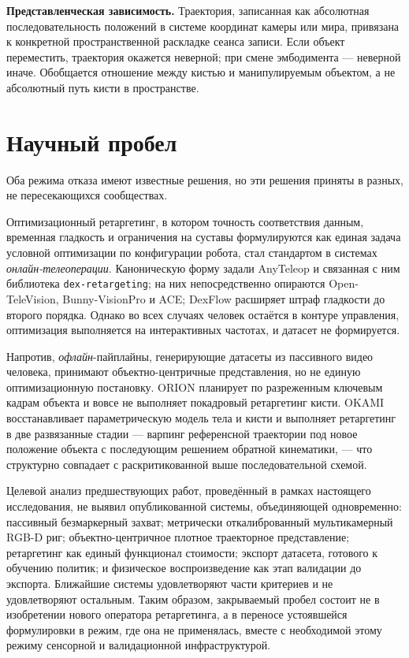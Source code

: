 \documentclass[12pt, a4paper, oneside]{report}
\begin{document}
\textbf{Представленческая зависимость.} Траектория, записанная как абсолютная
последовательность положений в системе координат камеры или мира, привязана к
конкретной пространственной раскладке сеанса записи. Если объект переместить,
траектория окажется неверной; при смене эмбодимента --- неверной иначе.
Обобщается отношение между кистью и манипулируемым объектом, а не абсолютный
путь кисти в пространстве.

\section{Научный пробел}

Оба режима отказа имеют известные решения, но эти решения приняты в разных,
не пересекающихся сообществах.

Оптимизационный ретаргетинг, в котором точность соответствия данным, временная
гладкость и ограничения на суставы формулируются как единая задача условной
оптимизации по конфигурации робота, стал стандартом в системах
\emph{онлайн-телеоперации}. Каноническую форму задали AnyTeleop и связанная с
ним библиотека \texttt{dex-retargeting}; на них непосредственно опираются
Open-TeleVision, Bunny-VisionPro и ACE; DexFlow расширяет штраф гладкости до
второго порядка. Однако во всех случаях человек остаётся в контуре управления,
оптимизация выполняется на интерактивных частотах, и датасет не формируется.

Напротив, \emph{офлайн}-пайплайны, генерирующие датасеты из пассивного видео
человека, принимают объектно-центричные представления, но не единую
оптимизационную постановку. ORION планирует по разреженным ключевым кадрам
объекта и вовсе не выполняет покадровый ретаргетинг кисти. OKAMI восстанавливает
параметрическую модель тела и кисти и выполняет ретаргетинг в две развязанные
стадии --- варпинг референсной траектории под новое положение объекта с
последующим решением обратной кинематики, --- что структурно совпадает с
раскритикованной выше последовательной схемой.

Целевой анализ предшествующих работ, проведённый в рамках настоящего
исследования, не выявил опубликованной системы, объединяющей одновременно:
пассивный безмаркерный захват; метрически откалиброванный мультикамерный RGB-D
риг; объектно-центричное плотное траекторное представление; ретаргетинг как
единый функционал стоимости; экспорт датасета, готового к обучению политик; и
физическое воспроизведение как этап валидации до экспорта. Ближайшие системы
удовлетворяют части критериев и не удовлетворяют остальным. Таким образом,
закрываемый пробел состоит не в изобретении нового оператора ретаргетинга, а в
переносе устоявшейся формулировки в режим, где она не применялась, вместе с
необходимой этому режиму сенсорной и валидационной инфраструктурой.
\end{document}
